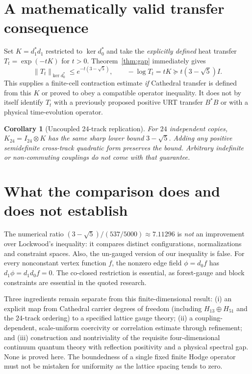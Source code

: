 \documentclass[11pt,a4paper]{article}
\newtheorem{corollary}{Corollary}
\begin{document}
\section{A mathematically valid transfer consequence}
Set $K=d_1^{\!*}d_1$ restricted to $\ker d_0^{\!*}$ and take the \emph{explicitly defined} heat transfer $T_t=\exp(-tK)$ for $t>0$. Theorem~\ref{thm:gap} immediately gives
\begin{equation}\label{eq:semigroup}
 \|T_t\|_{\ker d_0^{\!*}}\le e^{-t(3-\sqrt5)},
 \qquad -\log T_t=tK\succeq t(3-\sqrt5)I.
\end{equation}
This supplies a finite-cell contraction estimate \emph{if} Cathedral transfer is defined from this $K$ or proved to obey a compatible operator inequality. It does not by itself identify $T_t$ with a previously proposed positive URT transfer $B^{\!*}B$ or with a physical time-evolution operator.

\begin{corollary}[Uncoupled 24-track replication]
For $24$ independent copies, $K_{24}=I_{24}\otimes K$ has the same sharp lower bound $3-\sqrt5$. Adding any positive semidefinite cross-track quadratic form preserves the bound. Arbitrary indefinite or non-commuting couplings do not come with that guarantee.
\end{corollary}

\section{What the comparison does and does not establish}
The numerical ratio $(3-\sqrt5)/(537/5000)\approx7.11296$ is \emph{not} an improvement over Lockwood's inequality: it compares distinct configurations, normalizations and constraint spaces. Also, the un-gauged version of our inequality is false. For every nonconstant vertex function $f$, the nonzero edge field $\phi=d_0f$ has $d_1\phi=d_1d_0f=0$. The co-closed restriction is essential, as forest-gauge and block constraints are essential in the quoted research.

Three ingredients remain separate from this finite-dimensional result: (i) an explicit map from Cathedral carrier degrees of freedom (including $H_{13}\oplus H_{51}$ and the $24$-track ordering) to a specified lattice gauge theory; (ii) a coupling-dependent, scale-uniform coercivity or correlation estimate through refinement; and (iii) construction and nontriviality of the requisite four-dimensional continuum quantum theory with reflection positivity and a physical spectral gap. None is proved here. The boundedness of a single fixed finite Hodge operator must not be mistaken for uniformity as the lattice spacing tends to zero.
\end{document}
